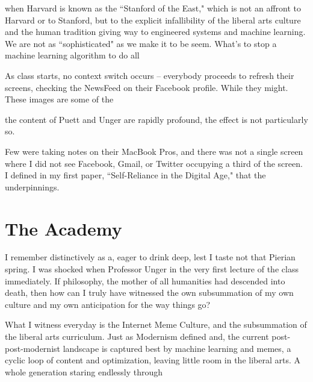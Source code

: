 \documentclass[12pt,letterpaper]{article}
\newif\ifdraft
\begin{document}
when Harvard is known as the ``Stanford of the East," which is not an affront to Harvard or to Stanford, but to the explicit infallibility of the liberal arts culture and the human tradition giving way to engineered systems and machine learning.  We are not as ``sophisticated" as we make it to be seem.  What's to stop a machine learning algorithm to do all

As class starts, no context switch occurs -- everybody proceeds to refresh their screens, checking the NewsFeed on their Facebook profile.  While they might.  These images are some of the 

the content of Puett and Unger are rapidly profound, the effect is not particularly so.  

Few were taking notes on their MacBook Pros, and there was not a single screen where I did not see Facebook, Gmail, or Twitter occupying a third of the screen.  I defined in my first paper, ``Self-Reliance in the Digital Age," that the underpinnings.

\section{The Academy}

I remember distinctively as a, eager to drink deep, lest I taste not that Pierian spring.  I was shocked when Professor Unger in the very first lecture of the class immediately.  If philosophy, the mother of all humanities had descended into death, then how can I truly have witnessed the own subsummation of my own culture and my own anticipation for the way things go?

 What I witness everyday is the Internet Meme Culture, and the subsummation of the liberal arts curriculum.  Just as Modernism defined and, the current post-post-modernist landscape is captured best by machine learning and memes, a cyclic loop of content and optimization, leaving little room in the liberal arts.  A whole generation staring endlessly through 





\ifdraft
My class schedule this entire semester had taken on an interesting flavor -- it was going to be taught.  The benefits of, it's like growing up with two parents who aren't divorced.


I can name of few dynamic duels that I know off -- Joe Blitzstein and Susan Murphy in the Statistics Department, James Mickens and Eddie Kohler in the CS department, whose operating systems class starts at three that very same day.
  \fi
\end{document}
